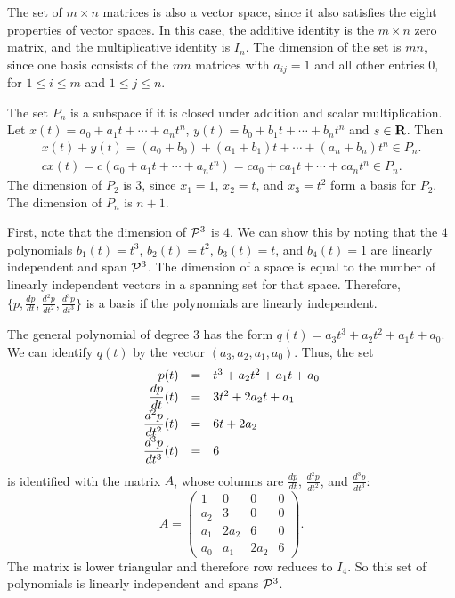 \para The set of $m \times n$ matrices is also a vector space, since
it also satisfies the eight properties of vector spaces.  In this
case, the additive identity is the $m \times n$ zero matrix, and
the multiplicative identity is $I_n$.  The dimension of the set is
$mn$, since one basis consists of the $mn$ matrices with $a_{ij}
= 1$ and all other entries $0$, for $1 \leq i \leq m$ and $1 \leq j
\leq n$.

The set $P_n$ is a subspace if it is closed under addition and
scalar multiplication.  Let $x(t) = a_0 + a_1t + \cdots +
a_nt^n$, $y(t) = b_0 + b_1t + \cdots + b_nt^n$ and $s \in \mbox{$\bf{R}$}$.
Then
\[
\begin{array}{l}
x(t) + y(t) = (a_0 + b_0) + (a_1 + b_1)t + \cdots + (a_n + b_n)t^n \in P_n.
\\
cx(t) = c(a_0 + a_1t + \cdots + a_nt^n) = ca_0 + ca_1t + \cdots + ca_nt^n
\in P_n.
\end{array}
\]
The dimension of $P_2$ is 3, since $x_1 = 1$, $x_2 = t$, and
$x_3 = t^2$ form a basis for $P_2$.  The dimension of $P_n$ is
$n + 1$.

First, note that the dimension of ${\cal P}^3$ is $4$.  We can show
this by noting that the $4$ polynomials $b_1(t) = t^3$, $b_2(t) =
t^2$, $b_3(t) = t$, and $b_4(t) = 1$ are linearly independent and
span ${\cal P}^3$.  The dimension of a space is equal to the number of
linearly independent vectors in a spanning set for that space.
Therefore, $\{p, \frac{dp}{dt}, \frac{d^2p}{dt^2}, \frac{d^3p}{dt^3}\}$
is a basis if the polynomials are linearly independent.

\para The general polynomial of degree $3$ has the form $q(t) =
a_3t^3 + a_2t^2 + a_1t + a_0$.  We can identify $q(t)$ by the vector 
$(a_3,a_2,a_1,a_0)$.  Thus, the set
\[
\begin{array}{rcl}
\displaystyle p(t) & = & t^3 + a_2t^2 + a_1t + a_0 \\
\displaystyle \frac{dp}{dt}(t) & = & 3t^2 + 2a_2t + a_1 \\
\displaystyle \frac{d^2p}{dt^2}(t) & = & 6t + 2a_2 \\
\displaystyle \frac{d^3p}{dt^3}(t) & = & 6 \end{array}
\]
is identified with the matrix $A$, whose columns are 
$\frac{dp}{dt}$, $\frac{d^2p}{dt^2}$, and $\frac{d^3p}{dt^3}$:
\[ A = \left(\begin{array}{cccc} 1 & 0 & 0 & 0 \\
a_2 & 3 & 0 & 0 \\ a_1 & 2a_2 & 6 & 0 \\ a_0 & a_1 & 2a_2 & 6
\end{array}\right). \]
The matrix is lower triangular and therefore row reduces to $I_4$.  So
this set of polynomials is linearly independent and spans ${\cal P}^3$.

